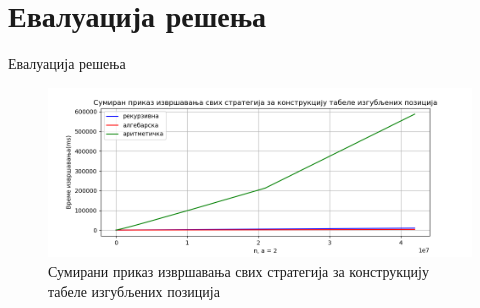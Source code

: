 \documentclass[10pt]{beamer}
\begin{document}
\section{Евалуација решења}

%	
%	
%
%	
%	
%
%	
%	

\begin{frame}{Евалуација решења}
	\begin{figure}[H]
		\begin{center}
			\includegraphics[width=\textwidth]{../src/statistics/picture/all.png}
		\end{center}
		\caption*{Сумирани приказ извршавања свих стратегија за конструкцију табеле изгубљених позиција}
	\end{figure}
\end{frame}
\end{document}
